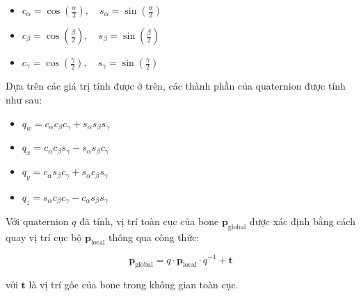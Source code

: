 \begin{itemize}
	\item $c_{\alpha} = \cos\left(\frac{\alpha}{2}\right), \quad s_{\alpha} = \sin\left(\frac{\alpha}{2}\right)$
	\item $c_{\beta} = \cos\left(\frac{\beta}{2}\right), \quad s_{\beta} = \sin\left(\frac{\beta}{2}\right)$
	\item $c_{\gamma} = \cos\left(\frac{\gamma}{2}\right), \quad s_{\gamma} = \sin\left(\frac{\gamma}{2}\right)$
\end{itemize}

Dựa trên các giá trị tính được ở trên, các thành phần của quaternion được tính như sau:


\begin{itemize}
	\item $q_w = c_{\alpha} c_{\beta} c_{\gamma} + s_{\alpha} s_{\beta} s_{\gamma}$
	\item $q_x = c_{\alpha} c_{\beta} s_{\gamma} - s_{\alpha} s_{\beta} c_{\gamma}$
	\item $q_y = c_{\alpha} s_{\beta} c_{\gamma} + s_{\alpha} c_{\beta} s_{\gamma}$
	\item $q_z = s_{\alpha} c_{\beta} c_{\gamma} - c_{\alpha} s_{\beta} s_{\gamma}$
\end{itemize}

Với quaternion $q$ đã tính, vị trí toàn cục của bone $\mathbf{p}_{\text{global}}$ được xác định bằng cách quay vị trí cục bộ $\mathbf{p}_{\text{local}}$ thông qua công thức:

\begin{equation}
	\mathbf{p}_{\text{global}} = q \cdot \mathbf{p}_{\text{local}} \cdot q^{-1} + \mathbf{t}
\end{equation}

với $\mathbf{t}$ là vị trí gốc của bone trong không gian toàn cục.



